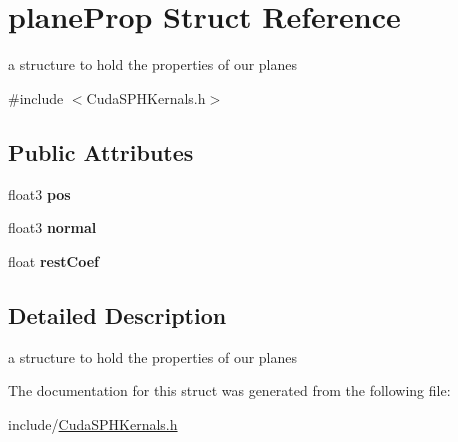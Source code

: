 \hypertarget{structplane_prop}{\section{plane\-Prop Struct Reference}
\label{structplane_prop}
}


a structure to hold the properties of our planes  




{\ttfamily \#include $<$Cuda\-S\-P\-H\-Kernals.\-h$>$}

\subsection*{Public Attributes}
\begin{DoxyCompactItemize}
\item 
\hypertarget{structplane_prop_a34453f09c8dbed51a1ac1c1cd5a610ea}{float3 {\bfseries pos}}\label{structplane_prop_a34453f09c8dbed51a1ac1c1cd5a610ea}

\item 
\hypertarget{structplane_prop_a4ed447d1e01222bd8b958ccd003d0563}{float3 {\bfseries normal}}\label{structplane_prop_a4ed447d1e01222bd8b958ccd003d0563}

\item 
\hypertarget{structplane_prop_a2d5b86467cb070520ede6dad51b0f2dc}{float {\bfseries rest\-Coef}}\label{structplane_prop_a2d5b86467cb070520ede6dad51b0f2dc}

\end{DoxyCompactItemize}


\subsection{Detailed Description}
a structure to hold the properties of our planes 

The documentation for this struct was generated from the following file\-:\begin{DoxyCompactItemize}
\item 
include/\hyperlink{_cuda_s_p_h_kernals_8h}{Cuda\-S\-P\-H\-Kernals.\-h}\end{DoxyCompactItemize}
